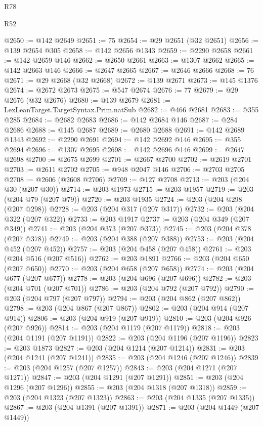 \begin{lexlean}{R78}
\begin{lexlean}{R52}
\begin{coremodule}
{{{{{{{{{{{{{{{{{{{{{{{{{{{{{{{{{{{{{{{{{{{{{{{{{{{{{{{{{{{{{{{{{{{{{{{{{{{{{{{{{{{{{{{{{{{{{{{{{{{{{{{{{{{{{{{{{{{{{{{{{{{{{{{{{{{{{{{{{{{{{{{{{{{{{{{{{{{{{{{{{{{{{{{{{{{{{{{{{{{{{{{{{{{{{{{{{{{{{{@2650 := @142 @2649
@2651 := 75
@2654 := @29 @2651 (@32 @2651)
@2656 := @139 @2654 @305
@2658 := @142 @2656 @1343
@2659 := @2290 @2658
@2661 := @142 @2659 @146
@2662 := @2650 @2661
@2663 := @1307 @2662
@2665 := @142 @2663 @146
@2666 := @2647 @2665
@2667 := @2646 @2666
@2668 := 76
@2671 := @29 @2668 (@32 @2668)
@2672 := @139 @2671
@2673 := @145 @1376
@2674 := @2672 @2673
@2675 := @547 @2674
@2676 := 77
@2679 := @29 @2676 (@32 @2676)
@2680 := @139 @2679
@2681 := LexLeanTarget.TargetSyntax.Prim.natSub
@2682 := @466 @2681
@2683 := @355 @285
@2684 := @2682 @2683
@2686 := @142 @2684 @146
@2687 := @284 @2686
@2688 := @145 @2687
@2689 := @2680 @2688
@2691 := @142 @2689 @1343
@2692 := @2290 @2691
@2694 := @142 @2692 @146
@2695 := @355 @2694
@2696 := @1307 @2695
@2698 := @142 @2696 @146
@2699 := @2647 @2698
@2700 := @2675 @2699
@2701 := @2667 @2700
@2702 := @2619 @2701
@2703 := @2611 @2702
@2705 := @948 @2047 @146
@2706 := @2703 @2705
@2708 := @2606 (@2608 @2706)
@2709 := @127 @2708
@2713 := @203 (@204 @30 (@207 @30))
@2714 := @203 @1973
@2715 := @203 @1957
@2719 := @203 (@204 @79 (@207 @79))
@2720 := @203 @1935
@2724 := @203 (@204 @298 (@207 @298))
@2728 := @203 (@204 @317 (@207 @317))
@2732 := @203 (@204 @322 (@207 @322))
@2733 := @203 @1917
@2737 := @203 (@204 @349 (@207 @349))
@2741 := @203 (@204 @373 (@207 @373))
@2745 := @203 (@204 @378 (@207 @378))
@2749 := @203 (@204 @388 (@207 @388))
@2753 := @203 (@204 @452 (@207 @452))
@2757 := @203 (@204 @458 (@207 @458))
@2761 := @203 (@204 @516 (@207 @516))
@2762 := @203 @1891
@2766 := @203 (@204 @650 (@207 @650))
@2770 := @203 (@204 @658 (@207 @658))
@2774 := @203 (@204 @677 (@207 @677))
@2778 := @203 (@204 @696 (@207 @696))
@2782 := @203 (@204 @701 (@207 @701))
@2786 := @203 (@204 @792 (@207 @792))
@2790 := @203 (@204 @797 (@207 @797))
@2794 := @203 (@204 @862 (@207 @862))
@2798 := @203 (@204 @867 (@207 @867))
@2802 := @203 (@204 @914 (@207 @914))
@2806 := @203 (@204 @919 (@207 @919))
@2810 := @203 (@204 @926 (@207 @926))
@2814 := @203 (@204 @1179 (@207 @1179))
@2818 := @203 (@204 @1191 (@207 @1191))
@2822 := @203 (@204 @1196 (@207 @1196))
@2823 := @203 @1873
@2827 := @203 (@204 @1214 (@207 @1214))
@2831 := @203 (@204 @1241 (@207 @1241))
@2835 := @203 (@204 @1246 (@207 @1246))
@2839 := @203 (@204 @1257 (@207 @1257))
@2843 := @203 (@204 @1271 (@207 @1271))
@2847 := @203 (@204 @1291 (@207 @1291))
@2851 := @203 (@204 @1296 (@207 @1296))
@2855 := @203 (@204 @1318 (@207 @1318))
@2859 := @203 (@204 @1323 (@207 @1323))
@2863 := @203 (@204 @1335 (@207 @1335))
@2867 := @203 (@204 @1391 (@207 @1391))
@2871 := @203 (@204 @1449 (@207 @1449))
}}}}}}}}}}}}}}}}}}}}}}}}}}}}}}}}}}}}}}}}}}}}}}}}}}}}}}}}}}}}}}}}}}}}}}}}}}}}}}}}}}}}}}}}}}}}}}}}}}}}}}}}}}}}}}}}}}}}}}}}}}}}}}}}}}}}}}}}}}}}}}}}}}}}}}}}}}}}}}}}}}}}}}}}}}}}}}}}}}}}}}}}}}}}}}}}}}}}}}
\end{coremodule}
\end{lexlean}
\end{lexlean}
